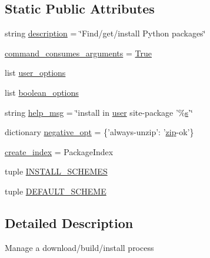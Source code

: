 \subsection*{Static Public Attributes}
\begin{DoxyCompactItemize}
\item 
string \hyperlink{classsetuptools_1_1command_1_1easy__install_1_1easy__install_a7413a87befc860cbf36d8b1bbd7270bc}{description} = \char`\"{}Find/get/install Python packages\char`\"{}
\item 
\hyperlink{classsetuptools_1_1command_1_1easy__install_1_1easy__install_ad2ac2ab809a764f2ec27fdba336b0ce4}{command\+\_\+consumes\+\_\+arguments} = \hyperlink{libqhull_8h_add3ca9eefe3b5b754426f51d3043e579}{True}
\item 
list \hyperlink{classsetuptools_1_1command_1_1easy__install_1_1easy__install_a0b3f110c5afd8ba998ae1bcadf434b83}{user\+\_\+options}
\item 
list \hyperlink{classsetuptools_1_1command_1_1easy__install_1_1easy__install_a088d7b675b927bb22a3678eb5f3d567e}{boolean\+\_\+options}
\item 
string \hyperlink{classsetuptools_1_1command_1_1easy__install_1_1easy__install_a9d63d6cb0c65c3f27b636f28d4a678af}{help\+\_\+msg} = \char`\"{}install in \hyperlink{classsetuptools_1_1command_1_1easy__install_1_1easy__install_ae4bf410b8b658b1c1a709ae8947e7e2c}{user} site-\/package '\%\hyperlink{indexexpr_8h_ae024b0db549122b44c349ae28ec990dc}{s}'\char`\"{}
\item 
dictionary \hyperlink{classsetuptools_1_1command_1_1easy__install_1_1easy__install_a6ffaccc1356c1fc7c8d716599cd65d58}{negative\+\_\+opt} = \{'always-\/unzip'\+: '\hyperlink{zip_8h_a4b545c2c4130ee85ae9a7c64fd09025e}{zip}-\/ok'\}
\item 
\hyperlink{classsetuptools_1_1command_1_1easy__install_1_1easy__install_a0fa9610fc4bff94a9847b570edc6b825}{create\+\_\+index} = Package\+Index
\item 
tuple \hyperlink{classsetuptools_1_1command_1_1easy__install_1_1easy__install_a23515ec2ca91cf5d61efe3e1bdbbf4aa}{I\+N\+S\+T\+A\+L\+L\+\_\+\+S\+C\+H\+E\+M\+E\+S}
\item 
tuple \hyperlink{classsetuptools_1_1command_1_1easy__install_1_1easy__install_ae5f1c3b51abf447540bbef1b8e9c472e}{D\+E\+F\+A\+U\+L\+T\+\_\+\+S\+C\+H\+E\+M\+E}
\end{DoxyCompactItemize}


\subsection{Detailed Description}
\begin{DoxyVerb}Manage a download/build/install process\end{DoxyVerb}
 


